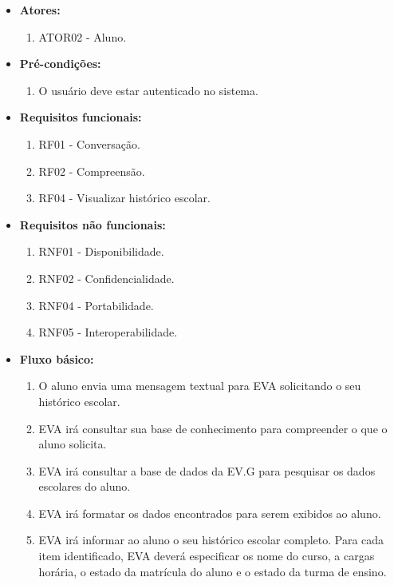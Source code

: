 \begin{itemize}
    \item \textbf{Atores:}
        \begin{enumerate}
            \item ATOR02 - Aluno.
        \end{enumerate}
    \item \textbf{Pré-condições:}
        \begin{enumerate}
            \item O usuário deve estar autenticado no sistema.
        \end{enumerate}
    \item \textbf{Requisitos funcionais:}
        \begin{enumerate}
            \item RF01 - Conversação.
            \item RF02 - Compreensão.
            \item RF04 - Visualizar histórico escolar.
        \end{enumerate}
    \item \textbf{Requisitos não funcionais:}
        \begin{enumerate}
            \item RNF01 - Disponibilidade.
            \item RNF02 - Confidencialidade.
            \item RNF04 - Portabilidade.
            \item RNF05 - Interoperabilidade.
        \end{enumerate}
    \item \textbf{Fluxo básico:}
        \begin{enumerate}
            \item O aluno envia uma mensagem textual para EVA solicitando o seu histórico escolar.
            \item EVA irá consultar sua base de conhecimento para compreender o que o aluno solicita.
            \item EVA irá consultar a base de dados da EV.G para pesquisar os dados escolares do aluno.
            \item EVA irá formatar os dados encontrados para serem exibidos ao aluno.
            \item EVA irá informar ao aluno o seu histórico escolar completo. Para cada item identificado, EVA deverá especificar os nome do curso, a cargas horária, o estado da matrícula do aluno e o estado da turma de ensino.

\end{enumerate}
\end{itemize}
